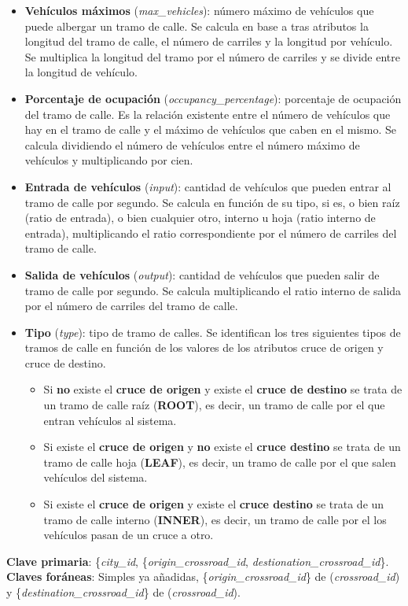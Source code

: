 \begin{itemize}
    \item \textbf{Vehículos máximos} (\textit{max\_vehicles}): número máximo de vehículos que puede albergar un tramo de calle. Se calcula en base a tras atributos la longitud del tramo de calle, el número de carriles y la longitud por vehículo. Se multiplica la longitud del tramo por el número de carriles y se divide entre la longitud de vehículo.
    \item \textbf{Porcentaje de ocupación} (\textit{occupancy\_percentage}): porcentaje de ocupación del tramo de calle. Es la relación existente entre el número de vehículos que hay en el tramo de calle y el máximo de vehículos que caben en el mismo. Se calcula dividiendo el número de vehículos entre el número máximo de vehículos y multiplicando por cien.
    \item \textbf{Entrada de vehículos} (\textit{input}): cantidad de vehículos que pueden entrar al tramo de calle por segundo. Se calcula en función de su tipo, si es, o bien raíz (ratio de entrada), o bien cualquier otro, interno u hoja (ratio interno de entrada), multiplicando el ratio correspondiente por el número de carriles del tramo de calle.
    \item \textbf{Salida de vehículos} (\textit{output}): cantidad de vehículos que pueden salir de tramo de calle por segundo. Se calcula multiplicando el ratio interno de salida por el número de carriles del tramo de calle.
    \item \textbf{Tipo} (\textit{type}): tipo de tramo de calles. Se identifican los tres siguientes tipos de tramos de calle en función de los valores de los atributos cruce de origen y cruce de destino.
    \begin{itemize}
        \item Si \textbf{no} existe el \textbf{cruce de origen} y existe el \textbf{cruce de destino} se trata de un tramo de calle raíz (\textbf{ROOT}), es decir, un tramo de calle por el que entran vehículos al sistema.
        \item Si existe el \textbf{cruce de origen} y \textbf{no} existe el \textbf{cruce destino} se trata de un tramo de calle hoja (\textbf{LEAF}), es decir, un tramo de calle por el que salen vehículos del sistema.
        \item Si existe el \textbf{cruce de origen} y existe el \textbf{cruce destino} se trata de un tramo de calle interno (\textbf{INNER}), es decir, un tramo de calle por el los vehículos pasan de un cruce a otro.
    \end{itemize}
\end{itemize}
\textbf{Clave primaria}: \{\textit{city\_id}, \{\textit{origin\_crossroad\_id}, \textit{destionation\_crossroad\_id}\}. \\
\textbf{Claves foráneas}: Simples ya añadidas, \{\textit{origin\_crossroad\_id}\} de (\textit{crossroad\_id}) y \{\textit{destination\_crossroad\_id}\} de (\textit{crossroad\_id}).

